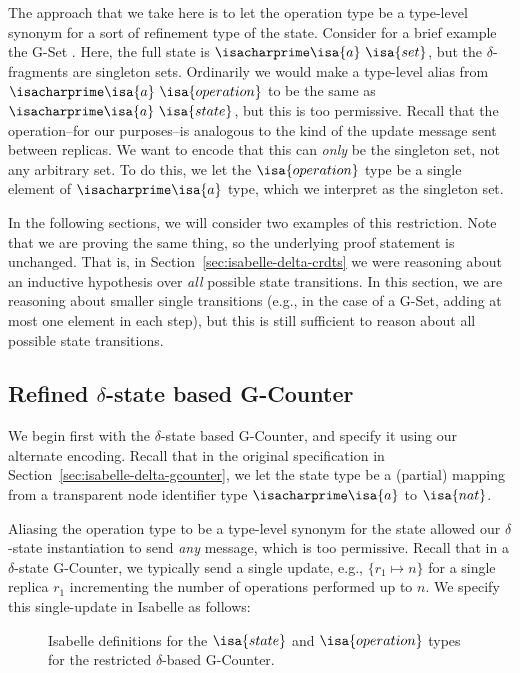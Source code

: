 The approach that we take here is to let the operation type be a type-level
synonym for a sort of refinement type of the state. Consider for a brief example
the G-Set \CRDT. Here, the full state is $\isacharprime\isa{a}~\isa{set}$, but
the $\delta$-fragments are singleton sets. Ordinarily we would make a type-level
alias from $\isacharprime\isa{a}~\isa{operation}$ to be the same as
$\isacharprime\isa{a}~\isa{state}$, but this is too permissive. Recall that the
operation--for our purposes--is analogous to the kind of the update message sent
between replicas. We want to encode that this can \emph{only} be the singleton
set, not any arbitrary set. To do this, we let the $\isa{operation}$ type be a
single element of $\isacharprime\isa{a}$ type, which we interpret as the
singleton set.

In the following sections, we will consider two examples of this restriction.
Note that we are proving the same thing, so the underlying proof statement is
unchanged. That is, in Section~\ref{sec:isabelle-delta-crdts} we were reasoning
about an inductive hypothesis over \emph{all} possible state transitions. In
this section, we are reasoning about smaller single transitions (e.g., in the
case of a G-Set, adding at most one element in each step), but this is still
sufficient to reason about all possible state transitions.

\subsection{Refined $\delta$-state based G-Counter}
We begin first with the $\delta$-state based G-Counter, and specify it using our
alternate encoding. Recall that in the original specification in
Section~\ref{sec:isabelle-delta-gcounter}, we let the state type be a (partial)
mapping from a transparent node identifier type $\isacharprime\isa{a}$ to
$\isa{nat}$.

Aliasing the operation type to be a type-level synonym for the state allowed our
$\delta$-state \CRDT instantiation to send \emph{any} message, which is too
permissive. Recall that in a $\delta$-state G-Counter, we typically send a
single update, e.g., $\{ r_1 \mapsto n \}$ for a single replica $r_1$
incrementing the number of operations performed up to $n$. We specify this
single-update in Isabelle as follows:

\begin{figure}[H]
  
  \caption{Isabelle definitions for the $\isa{state}$ and $\isa{operation}$
    types for the restricted $\delta$-based G-Counter.}
\end{figure}

